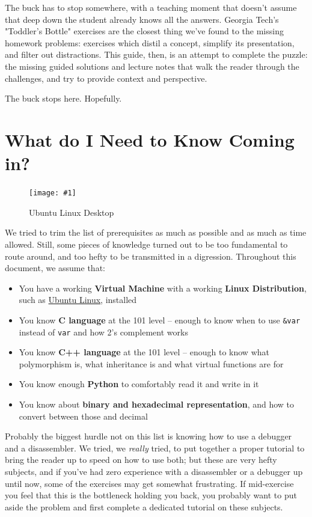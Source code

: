 \documentclass{article}
\newcommand{\wrapimagerightcap}[2] {
    \begin{figure}\begin{center}\texttt{[image: \#1]}\end{center}\caption{#2}\end{figure}}
\newcommand{\code}[1]{\colorbox{ubuntuback}{\texttt{#1}}}
\begin{document}
The buck has to stop somewhere, with a teaching moment that doesn't assume that deep down the student already knows all the answers. Georgia Tech's "Toddler's Bottle" exercises are the closest thing we've found to the missing homework problems: exercises which distil a concept, simplify its presentation, and filter out distractions. This guide, then, is an attempt to complete the puzzle: the missing guided solutions and lecture notes that walk the reader through the challenges, and try to provide context and perspective.

The buck stops here. Hopefully.

\section{What do I Need to Know Coming in?}

\wrapimagerightcap{./images/ubuntu.png}{Ubuntu Linux Desktop}

We tried to trim the list of prerequisites as much as possible and as much as time allowed. Still, some pieces of knowledge turned out to be too fundamental to route around, and too hefty to be transmitted in a digression. Throughout this document, we assume that:

\begin{itemize}
    \item You have a working \textbf{Virtual Machine} with a working \textbf{Linux Distribution}, such as \href{https://ubuntu.org}{Ubuntu Linux}, installed
    \item You know \textbf{C language} at the 101 level -- enough to know when to use \code{\&var} instead of \code{var} and how 2's complement works
    \item You know \textbf{C++ language} at the 101 level -- enough to know what polymorphism is, what inheritance is and what virtual functions are for
    \item You know enough \textbf{Python} to comfortably read it and write in it
    \item You know about \textbf{binary and hexadecimal representation}, and how to convert between those and decimal
\end{itemize}

Probably the biggest hurdle not on this list is knowing how to use a debugger and a disassembler. We tried, we \textit{really} tried, to put together a proper tutorial to bring the reader up to speed on how to use both; but these are very hefty subjects, and if you've had zero experience with a disassembler or a debugger up until now, some of the exercises may get somewhat frustrating. If mid-exercise you feel that this is the bottleneck holding you back, you probably want to put aside the problem and first complete a dedicated tutorial on these subjects.
\end{document}

